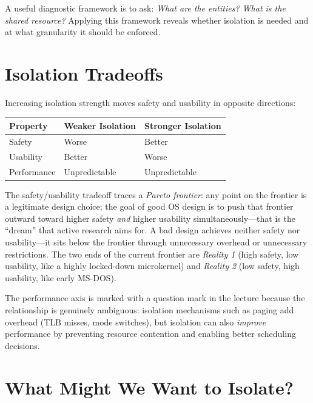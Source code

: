\documentclass[11pt]{article}
\begin{document}
A useful diagnostic framework is to ask: \emph{What are the entities? What is the shared
resource?} Applying this framework reveals whether isolation is needed and at what
granularity it should be enforced.

\section{Isolation Tradeoffs}

Increasing isolation strength moves safety and usability in opposite directions:

\begin{center}
\begin{tabular}{lll}
\toprule
\textbf{Property} & \textbf{Weaker Isolation} & \textbf{Stronger Isolation} \\
\midrule
Safety     & Worse  & Better \\
Usability  & Better & Worse  \\
Performance & Unpredictable & Unpredictable \\
\bottomrule
\end{tabular}
\end{center}

The safety/usability tradeoff traces a \emph{Pareto frontier}: any point on the frontier is
a legitimate design choice; the goal of good OS design is to push that frontier outward
toward higher safety \emph{and} higher usability simultaneously---that is the ``dream'' that
active research aims for. A bad design achieves neither safety nor usability---it sits
below the frontier through unnecessary overhead or unnecessary restrictions. The two ends
of the current frontier are \emph{Reality 1} (high safety, low usability, like a highly
locked-down microkernel) and \emph{Reality 2} (low safety, high usability, like early
MS-DOS).

The performance axis is marked with a question mark in the lecture because the relationship
is genuinely ambiguous: isolation mechanisms such as paging add overhead (TLB misses, mode
switches), but isolation can also \emph{improve} performance by preventing resource
contention and enabling better scheduling decisions.

\section{What Might We Want to Isolate?}
\end{document}
